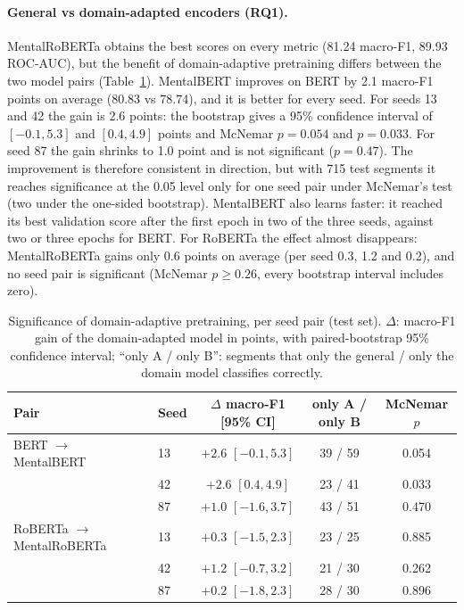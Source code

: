 \paragraph{General vs domain-adapted encoders (RQ1).}
MentalRoBERTa obtains the best scores on every metric (81.24 macro-F1, 89.93 ROC-AUC), but the
benefit of domain-adaptive pretraining differs between the two model pairs (Table~\ref{tab:sig}).
MentalBERT improves on BERT by 2.1 macro-F1 points on average (80.83 vs 78.74), and it is better for
every seed. For seeds 13 and 42 the gain is 2.6 points: the bootstrap gives a 95\% confidence interval
of $[-0.1, 5.3]$ and $[0.4, 4.9]$ points and McNemar $p = 0.054$ and $p = 0.033$. For seed 87 the gain
shrinks to 1.0 point and is not significant ($p = 0.47$). The improvement is therefore consistent in
direction, but with 715 test segments it reaches significance at the 0.05 level only for one seed pair
under McNemar's test (two under the one-sided bootstrap). MentalBERT also learns faster: it reached
its best validation score after the first epoch in two of the three seeds, against two or three epochs
for BERT. For RoBERTa the effect almost disappears: MentalRoBERTa gains only 0.6 points on average
(per seed 0.3, 1.2 and 0.2), and no seed pair is significant (McNemar $p \ge 0.26$, every bootstrap
interval includes zero).

\begin{table}
  \caption{Significance of domain-adaptive pretraining, per seed pair (test set). $\Delta$: macro-F1
  gain of the domain-adapted model in points, with paired-bootstrap 95\% confidence interval;
  ``only A / only B'': segments that only the general / only the domain model classifies correctly.}
  \label{tab:sig}
  \begin{minipage}{\textwidth}
  \begin{tabular}{llccc}
  \hline\hline
  Pair & Seed & $\Delta$ macro-F1 [95\% CI] & only A / only B & McNemar $p$\\
  \hline
  BERT $\rightarrow$ MentalBERT       & 13 & $+2.6$ $[-0.1, 5.3]$ & 39 / 59 & 0.054\\
                                      & 42 & $+2.6$ $[0.4, 4.9]$  & 23 / 41 & 0.033\\
                                      & 87 & $+1.0$ $[-1.6, 3.7]$ & 43 / 51 & 0.470\\
  RoBERTa $\rightarrow$ MentalRoBERTa & 13 & $+0.3$ $[-1.5, 2.3]$ & 23 / 25 & 0.885\\
                                      & 42 & $+1.2$ $[-0.7, 3.2]$ & 21 / 30 & 0.262\\
                                      & 87 & $+0.2$ $[-1.8, 2.3]$ & 28 / 30 & 0.896\\
  \hline\hline
  \end{tabular}
  \end{minipage}
\end{table}

